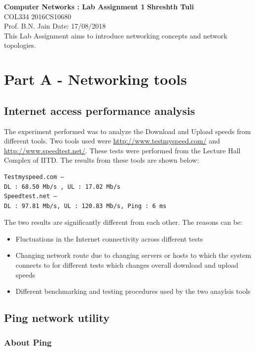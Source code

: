 \documentclass[a4paper, 11pt]{article}
\begin{document}
\noindent
\large\textbf{Computer Networks : Lab Assignment 1} \hfill \textbf{Shreshth Tuli} \\
\normalsize COL334 \hfill 2016CS10680 \\
Prof. B.N. Jain \hfill Date: 17/08/2018 \\

This Lab Assignment aims to introduce networking concepts and network topologies.

\section{Part A - Networking tools}

\subsection{Internet access performance analysis}

The experiment performed was to analyze the Download and Upload speeds from different tools. Two tools used were \url{http://www.testmyspeed.com/} and \url{http://www.speedtest.net/}. These tests were performed from the Lecture Hall Complex of IITD. The results from these tools are shown below:

\begin{lstlisting}[style=BashInputStyle]
Testmyspeed.com – 
DL : 68.50 Mb/s , UL : 17.02 Mb/s
Speedtest.net – 
DL : 97.81 Mb/s, UL : 120.83 Mb/s, Ping : 6 ms
\end{lstlisting}

The two results are significantly different from each other. The reasons can be:
\begin{itemize}
\item Fluctuations in the Internet connectivity across different tests
\item Changing network route due to changing servers or hosts to which the system connects to for different tests which changes overall download and upload speeds
\item Different benchmarking and testing procedures used by the two anaylsis tools 
\end{itemize}
 
\subsection{Ping network utility}

\subsubsection{About Ping}
\end{document}
